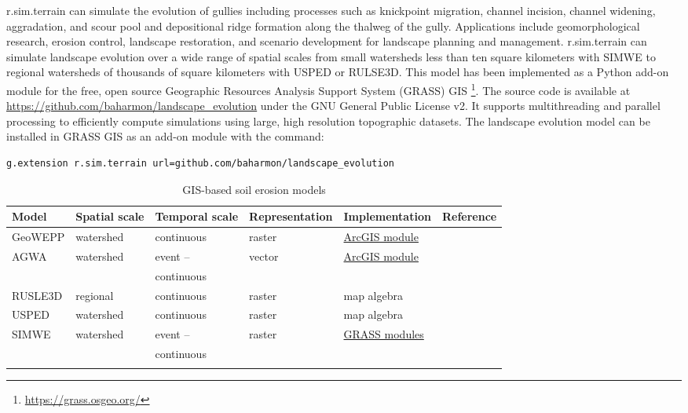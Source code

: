\documentclass[esurf, manuscript]{copernicus}
\begin{document}
\lowercase{r.sim.terrain}
can simulate the evolution of gullies
including processes such as 
knickpoint migration,
channel incision, 
channel widening, 
aggradation, and
scour pool and 
depositional ridge formation
along the thalweg of the gully. 
Applications include 
geomorphological research,
erosion control, 
landscape restoration, 
and scenario development 
for landscape planning and management.
r.sim.terrain can simulate landscape evolution 
over a wide range of spatial scales from small watersheds 
less than ten square kilometers
with SIMWE
to regional watersheds
of thousands of square kilometers
with USPED or RULSE3D. 
This model has been implemented 
as a Python add-on module 
for the free, open source
Geographic Resources Analysis Support System (GRASS) GIS
\footnote{\url{https://grass.osgeo.org/}}. 
The source code is available at 
\url{https://github.com/baharmon/landscape\_evolution} 
under the GNU General Public License v2. %
It supports multithreading and parallel processing
to efficiently compute simulations 
using large, high resolution topographic datasets.
%
The landscape evolution model 
can be installed in GRASS GIS as an add-on module 
with the command: 
\begin{lstlisting}
g.extension r.sim.terrain url=github.com/baharmon/landscape_evolution
\end{lstlisting}


\begin{table}
\small
\caption{GIS-based soil erosion models}
\begin{tabu} to \textwidth {XXXXXl}
\toprule
Model & Spatial scale &  Temporal scale & Representation & Implementation & Reference\\
\midrule
GeoWEPP & watershed & continuous & raster & \href{http://geowepp.geog.buffalo.edu/}{ArcGIS module} & \citep{Flanagan2013}\\
AGWA  & watershed & event -- & vector & \href{https://www.tucson.ars.ag.gov/agwa/}{ArcGIS module} & \citep{Guertin2015}\\
&& continuous\\
RUSLE3D & regional & continuous & raster & map algebra & \citep{Mitasova1996}\\
USPED & watershed & continuous & raster & map algebra & \citep{Mitasova1996}\\
SIMWE & watershed & event -- & raster & \href{https://grass.osgeo.org/grass74/manuals/r.sim.sediment.html}{GRASS modules} & \citep{Mitas1998}\\
&& continuous\\
\bottomrule
\\
\end{tabu}
\label{table:erosion_models} 
\end{table}
\end{document}
